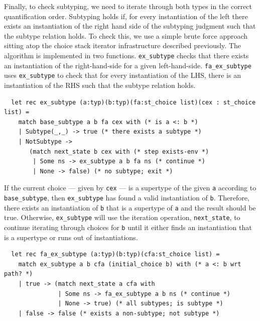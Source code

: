 \documentclass[a4paper,english]{lipics-v2019}
\begin{document}
\par
Finally, to check subtyping, we need to iterate through both types in the 
correct quantification order. Subtyping holds if, for every instantiation 
of the left there exists an instantiation of the right hand side of the
subtyping judgment such that the subtype relation holds. To check this,
we use a simple brute force approach sitting atop the choice stack iterator
infrastructure described previously. The algorithm is implemented in two
functions. \verb|ex_subtype| checks that there exists an instantiation
of the right-hand-side for a given left-hand-side. \verb|fa_ex_subtype|
uses \verb|ex_subtype| to check that for every instantiation of the LHS,
there is an instantiation of the RHS such that the subtype relation
holds. 
\par
\begin{small}
\begin{verbatim}
  let rec ex_subtype (a:typ)(b:typ)(fa:st_choice list)(cex : st_choice list) =
    match base_subtype a b fa cex with (* is a <: b *)
    | Subtype(_,_) -> true (* there exists a subtype *)
    | NotSubtype -> 
       (match next_state b cex with (* step exists-env *)
        | Some ns -> ex_subtype a b fa ns (* continue *)
        | None -> false) (* no subtype; exit *)
\end{verbatim}
\end{small}
If the current choice --- given by \verb|cex| --- is a supertype of the given \verb|a| according
to \verb|base_subtype|, then \verb|ex_subtype| has found a valid instantiation of \verb|b|. Therefore,
there exists an instantiation of \verb|b| that is a supertype of \verb|a| and the result should be true.
Otherwise, \verb|ex_subtype| will use the iteration operation, \verb|next_state|, to continue iterating
through choices for \verb|b| until it either finds an instantiation that is a supertype or runs out
of instantiations.

\begin{small}
  \begin{verbatim}
  let rec fa_ex_subtype (a:typ)(b:typ)(cfa:st_choice list) =
    match ex_subtype a b cfa (initial_choice b) with (* a <: b wrt path? *)
    | true -> (match next_state a cfa with
               | Some ns -> fa_ex_subtype a b ns (* continue *)
               | None -> true) (* all subtypes; is subtype *)
    | false -> false (* exists a non-subtype; not subtype *)
\end{verbatim}
\end{small}
\end{document}
